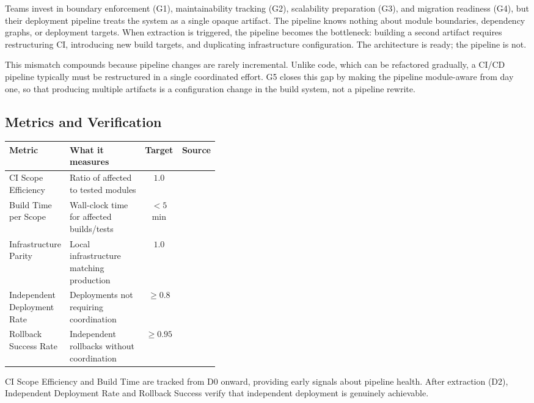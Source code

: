 Teams invest in boundary enforcement (G1), maintainability tracking (G2), scalability preparation (G3), and migration readiness (G4), but their deployment pipeline treats the system as a single opaque artifact. The pipeline knows nothing about module boundaries, dependency graphs, or deployment targets. When extraction is triggered, the pipeline becomes the bottleneck: building a second artifact requires restructuring CI, introducing new build targets, and duplicating infrastructure configuration. The architecture is ready; the pipeline is not.

This mismatch compounds because pipeline changes are rarely incremental. Unlike code, which can be refactored gradually, a CI/CD pipeline typically must be restructured in a single coordinated effort. G5 closes this gap by making the pipeline module-aware from day one, so that producing multiple artifacts is a configuration change in the build system, not a pipeline rewrite.

\subsection*{Metrics and Verification}

\medskip
\noindent
\small
\begin{tabularx}{\linewidth}{p{0.28\linewidth} X c p{0.12\linewidth}}
\toprule
\textbf{Metric} & \textbf{What it measures} & \textbf{Target} & \textbf{Source} \\
\midrule
CI Scope Efficiency & Ratio of affected to tested modules & $1.0$ & \cite{FordParsons2017} \\
Build Time per Scope & Wall-clock time for affected builds/tests & $< 5$ min & \cite{fairbanks2010justenough} \\
Infrastructure Parity & Local infrastructure matching production & $1.0$ & \cite{martin2012clean} \\
Independent Deployment Rate & Deployments not requiring coordination & $\geq 0.8$ & \cite{richardson2018microservices} \\
Rollback Success Rate & Independent rollbacks without coordination & $\geq 0.95$ & \cite{FordParsons2017} \\
\bottomrule
\end{tabularx}
\normalsize

\medskip
\noindent
CI Scope Efficiency and Build Time are tracked from D0 onward, providing early signals about pipeline health. After extraction (D2), Independent Deployment Rate and Rollback Success verify that independent deployment is genuinely achievable.



